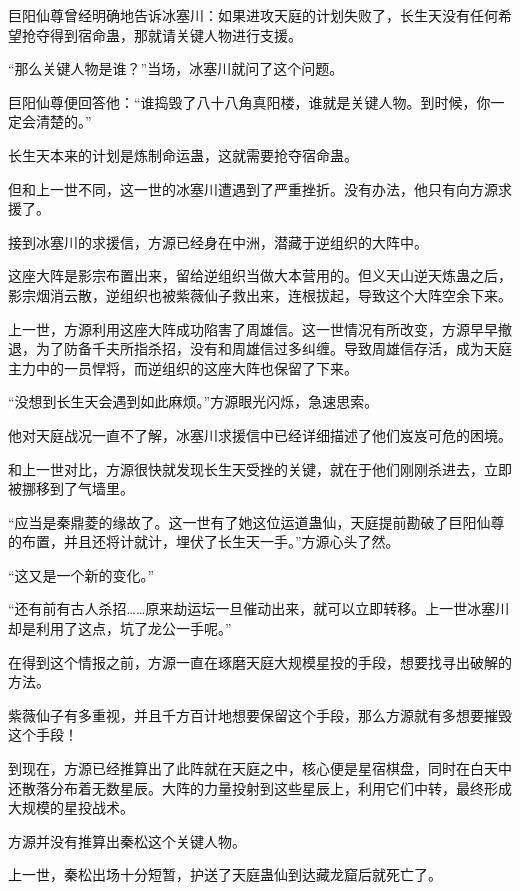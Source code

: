 
\begin{this_body}

巨阳仙尊曾经明确地告诉冰塞川：如果进攻天庭的计划失败了，长生天没有任何希望抢夺得到宿命蛊，那就请关键人物进行支援。

“那么关键人物是谁？”当场，冰塞川就问了这个问题。

巨阳仙尊便回答他：“谁捣毁了八十八角真阳楼，谁就是关键人物。到时候，你一定会清楚的。”

长生天本来的计划是炼制命运蛊，这就需要抢夺宿命蛊。

但和上一世不同，这一世的冰塞川遭遇到了严重挫折。没有办法，他只有向方源求援了。

接到冰塞川的求援信，方源已经身在中洲，潜藏于逆组织的大阵中。

这座大阵是影宗布置出来，留给逆组织当做大本营用的。但义天山逆天炼蛊之后，影宗烟消云散，逆组织也被紫薇仙子救出来，连根拔起，导致这个大阵空余下来。

上一世，方源利用这座大阵成功陷害了周雄信。这一世情况有所改变，方源早早撤退，为了防备千夫所指杀招，没有和周雄信过多纠缠。导致周雄信存活，成为天庭主力中的一员悍将，而逆组织的这座大阵也保留了下来。

“没想到长生天会遇到如此麻烦。”方源眼光闪烁，急速思索。

他对天庭战况一直不了解，冰塞川求援信中已经详细描述了他们岌岌可危的困境。

和上一世对比，方源很快就发现长生天受挫的关键，就在于他们刚刚杀进去，立即被挪移到了气墙里。

“应当是秦鼎菱的缘故了。这一世有了她这位运道蛊仙，天庭提前勘破了巨阳仙尊的布置，并且还将计就计，埋伏了长生天一手。”方源心头了然。

“这又是一个新的变化。”

“还有前有古人杀招……原来劫运坛一旦催动出来，就可以立即转移。上一世冰塞川却是利用了这点，坑了龙公一手呢。”

在得到这个情报之前，方源一直在琢磨天庭大规模星投的手段，想要找寻出破解的方法。

紫薇仙子有多重视，并且千方百计地想要保留这个手段，那么方源就有多想要摧毁这个手段！

到现在，方源已经推算出了此阵就在天庭之中，核心便是星宿棋盘，同时在白天中还散落分布着无数星辰。大阵的力量投射到这些星辰上，利用它们中转，最终形成大规模的星投战术。

方源并没有推算出秦松这个关键人物。

上一世，秦松出场十分短暂，护送了天庭蛊仙到达藏龙窟后就死亡了。


\end{this_body}

